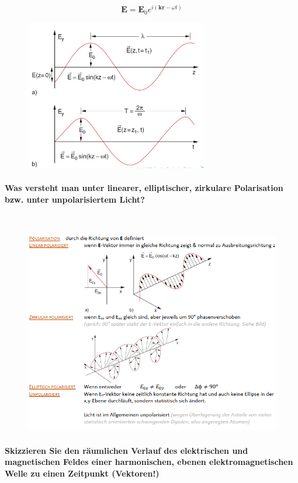 \documentclass[a4paper, 11pt, parskip=half]{scrartcl}
\begin{document}
\begin{equation}
\textbf{E} = \textbf{E}_0 e^{i(\textbf{kr} - \omega t)}
\end{equation}
\begin{figure}[H]
    \centering
    \includegraphics[width=8cm]{image/13/2.png}
\end{figure}

\paragraph{Was versteht man unter linearer, elliptischer, zirkulare Polarisation bzw. unter
unpolarisiertem Licht?} ~

\begin{figure}[H]
    \centering
    \includegraphics[width=14cm]{image/13/3.png}
\end{figure}

\paragraph{Skizzieren Sie den räumlichen Verlauf des elektrischen und magnetischen Feldes einer
harmonischen, ebenen elektromagnetischen Welle zu einen Zeitpunkt (Vektoren!)} ~
\end{document}
